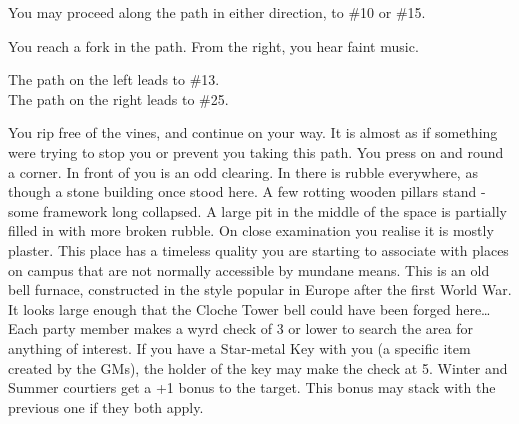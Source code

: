 \documentclass[green]{gl2018}
\begin{document}
\begin{large}
\begin{location}{32}
\begin{fromhere}
You may proceed along the path in either direction, to \#10 or \#15.
\end{fromhere}
\end{location}
\begin{location}{33}
You reach a fork in the path.  From the right, you hear faint music.
\begin{fromhere}The path on the left leads to \#13.\\
The path on the right leads to \#25.
\end{fromhere}
\end{location}
\begin{location}{34}
You rip free of the vines, and continue on your way. It is almost as if something were trying to stop you or prevent you taking this path. You press on and round a corner. In front of you is an odd clearing. In there is rubble everywhere, as though a stone building once stood here. A few rotting wooden pillars stand - some framework long collapsed. A large pit in the middle of the space is partially filled in with more broken rubble. On close examination you realise it is mostly plaster. This place has a timeless quality you are starting to associate with places on campus that are not normally accessible by mundane means. This is an old bell furnace, constructed in the style popular in Europe after the first World War. It looks large enough that the Cloche Tower bell could have been forged here… Each party member makes a wyrd check of 3 or lower to search the area for anything of interest. If you have a Star-metal Key with you (a specific item created by the GMs), the holder of the key may make the check at 5. Winter and Summer courtiers get a +1 bonus to the target. This bonus may stack with the previous one if they both apply. 


\end{location}
\end{large}
\end{document}
